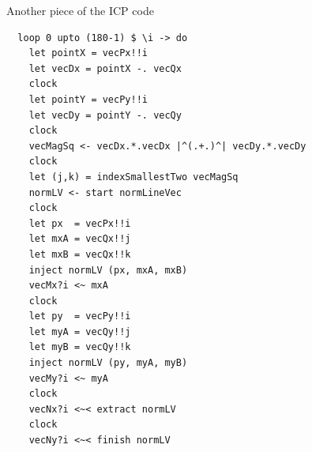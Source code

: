 \documentclass[pdf]{beamer}
\begin{document}
\begin{frame}[fragile]{Another piece of the ICP code}
\begin{scriptsize}
\begin{verbatim}
  loop 0 upto (180-1) $ \i -> do
    let pointX = vecPx!!i
    let vecDx = pointX -. vecQx
    clock
    let pointY = vecPy!!i
    let vecDy = pointY -. vecQy
    clock
    vecMagSq <- vecDx.*.vecDx |^(.+.)^| vecDy.*.vecDy
    clock
    let (j,k) = indexSmallestTwo vecMagSq
    normLV <- start normLineVec
    clock
    let px  = vecPx!!i
    let mxA = vecQx!!j
    let mxB = vecQx!!k
    inject normLV (px, mxA, mxB)
    vecMx?i <~ mxA
    clock
    let py  = vecPy!!i
    let myA = vecQy!!j
    let myB = vecQy!!k
    inject normLV (py, myA, myB)
    vecMy?i <~ myA
    clock
    vecNx?i <~< extract normLV
    clock
    vecNy?i <~< finish normLV
\end{verbatim}
\end{scriptsize}


\end{frame}
\end{document}
